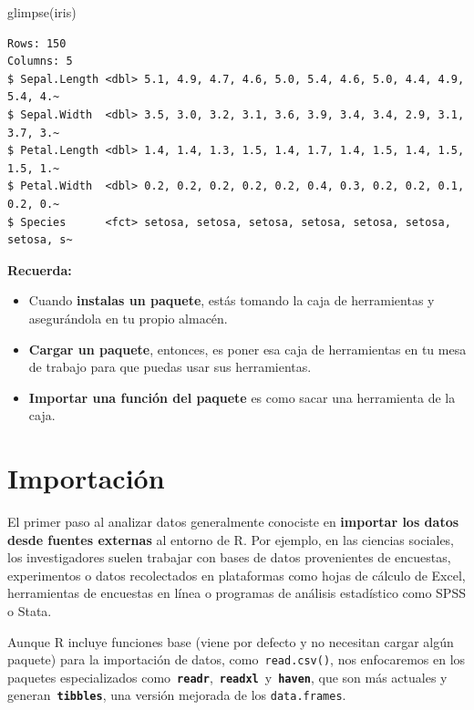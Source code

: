 \documentclass[
  letterpaper,
  DIV=11,
  numbers=noendperiod,
  twoside]{scrreprt}
\newenvironment{Shaded}{\begin{snugshade}}{\end{snugshade}}
\newcommand{\FunctionTok}[1]{\textcolor[rgb]{0.28,0.35,0.67}{#1}}
\newcommand{\NormalTok}[1]{\textcolor[rgb]{0.00,0.23,0.31}{#1}}
\begin{document}
\begin{Shaded}
\begin{Highlighting}[]
\FunctionTok{glimpse}\NormalTok{(iris)}
\end{Highlighting}
\end{Shaded}

\begin{verbatim}
Rows: 150
Columns: 5
$ Sepal.Length <dbl> 5.1, 4.9, 4.7, 4.6, 5.0, 5.4, 4.6, 5.0, 4.4, 4.9, 5.4, 4.~
$ Sepal.Width  <dbl> 3.5, 3.0, 3.2, 3.1, 3.6, 3.9, 3.4, 3.4, 2.9, 3.1, 3.7, 3.~
$ Petal.Length <dbl> 1.4, 1.4, 1.3, 1.5, 1.4, 1.7, 1.4, 1.5, 1.4, 1.5, 1.5, 1.~
$ Petal.Width  <dbl> 0.2, 0.2, 0.2, 0.2, 0.2, 0.4, 0.3, 0.2, 0.2, 0.1, 0.2, 0.~
$ Species      <fct> setosa, setosa, setosa, setosa, setosa, setosa, setosa, s~
\end{verbatim}

\textbf{Recuerda:}

\begin{itemize}
\item
  Cuando \textbf{instalas un paquete}, estás tomando la caja de
  herramientas y asegurándola en tu propio almacén.
\item
  \textbf{Cargar un paquete}, entonces, es poner esa caja de
  herramientas en tu mesa de trabajo para que puedas usar sus
  herramientas.
\item
  \textbf{Importar una función del paquete} es como sacar una
  herramienta de la caja.
\end{itemize}

\chapter{Importación}\label{importaciuxf3n}

El primer paso al analizar datos generalmente conociste en
\textbf{importar los datos desde fuentes externas} al entorno de R. Por
ejemplo, en las ciencias sociales, los investigadores suelen trabajar
con bases de datos provenientes de encuestas, experimentos o datos
recolectados en plataformas como hojas de cálculo de Excel, herramientas
de encuestas en línea o programas de análisis estadístico como SPSS o
Stata.

\begin{tcolorbox}[enhanced jigsaw, titlerule=0mm, title=\textcolor{quarto-callout-note-color}{\faInfo}\hspace{0.5em}{Dato}, colback=white, opacityback=0, breakable, toprule=.15mm, left=2mm, leftrule=.75mm, colframe=quarto-callout-note-color-frame, bottomtitle=1mm, rightrule=.15mm, opacitybacktitle=0.6, coltitle=black, arc=.35mm, bottomrule=.15mm, toptitle=1mm, colbacktitle=quarto-callout-note-color!10!white]

Aunque R incluye funciones base (viene por defecto y no necesitan cargar
algún paquete) para la importación de datos, como~\texttt{read.csv()},
nos enfocaremos en los paquetes especializados
como~\textbf{\texttt{readr}},~\textbf{\texttt{readxl}}~y~\textbf{\texttt{haven}},
que son más actuales y generan~\textbf{\texttt{tibbles}}, una versión
mejorada de los \texttt{data.frames}.

\end{tcolorbox}
\end{document}
